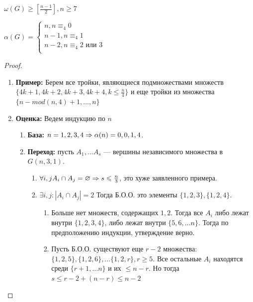 \begin{problem}
    \(\omega(G) \ge \left[\frac{n - 1}{2}\right], n \ge 7\)
\end{problem}

\begin{theorem}
    \(\alpha(G) = \left\{\begin{array}{l}
        n, n \equiv_4 0 \\
        n - 1, n \equiv_4 1 \\
        n - 2, n \equiv_4 2 \text{ или } 3 \\
    \end{array}\right.\)
\end{theorem}
\begin{proof}\indent
    \begin{enumerate}
        \item[] \textbf{Пример:}
        Берем все тройки, являющиеся подмножествами множеств \(\{4k + 1, 4k + 2, 4k + 3, 4k + 4, k \le \frac{n}{4}\}\) и еще тройки из множества \(\{n - mod(n, 4) + 1, \dots,  n\}\)
        \item[] \textbf{Оценка:} 
        Ведем индукцию по \(n\)
        \begin{enumerate}
            \item[] \textbf{База:} \(n = 1, 2, 3, 4 \Rightarrow \alpha(n) = 0, 0, 1, 4\).
            \item[] \textbf{Переход:} пусть \(A_1, \dots A_s\) --- вершины независимого множества в \(G(n, 3, 1)\).
            \begin{enumerate}
                \item \(\forall i, j A_i \cap A_j = \varnothing \Rightarrow s \leqslant \frac{n}{3}\), это хуже заявленного примера.
                \item \(\exists i, j: |A_i \cap A_j| = 2\)
                Тогда Б.О.О. это элементы \(\{1, 2, 3\}, \{1, 2, 4\}\).
                \begin{enumerate}
                    \item Больше нет множеств, содержащих \(1, 2\). Тогда все \(A_i\) либо лежат внутри \(\{1, 2, 3, 4\}\), либо лежат внутри \(\{5, 6, \dots n\}\). Тогда по предположению индукции, утверждение верно.
                    \item Пусть Б.О.О. существуют еще \(r - 2\) множества: \(\{1, 2, 5\}, \{1, 2, 6\}, \dots \{1, 2, r\}, r \ge 5\). Все остальные \(A_i\) находятся среди \(\{r + 1, \dots n\}\) и их \(\le n - r\). Но тогда \(s \le r - 2 + (n - r) \le n - 2\)
                \end{enumerate}
            \end{enumerate}
        \end{enumerate}
    \end{enumerate}
\end{proof}
